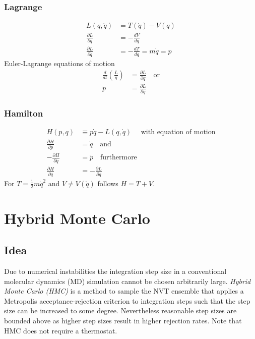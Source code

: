 \subsubsection{Lagrange}
\begin{equation}
  \begin{split}
    L(q, \dot{q}) 
    & = T(\dot{q})-V(q) \\
    \frac{\partial L}{\partial q} 
    & = -\frac{dV}{dq} \\
    \frac{\partial L}{\partial \dot{q}} 
    & = -\frac{dT}{d\dot{q}} = m\dot{q}=p
  \end{split}
\end{equation}
Euler-Lagrange equations of motion
\begin{equation}
  \begin{split}
    \frac{d}{dt}\left(\frac{L}{\dot{q}}\right) 
    & = \frac{\partial L}{\partial q} \quad \textrm{or} \\
    \dot{p} 
    & = \frac{\partial L}{\partial q} 
  \end{split}
\end{equation}
\subsubsection{Hamilton}
\begin{equation}
  \begin{split}
    H(p,q) 
    & \equiv p\dot{q}-L(q,\dot{q}) \quad \textrm{ with equation of motion} \\
    \frac{\partial H}{\partial p} 
    & = \dot{q} \quad \textrm{and} \\
    -\frac{\partial H}{\partial q}
    & = \dot{p} \quad \textrm{furthermore} \\
    \frac{\partial H}{\partial q} 
    & =  -\frac{\partial L}{\partial q} 
  \end{split}
\end{equation}
For \( T = \frac{1}{2}m\dot{q}^2\) and \( V \neq V(\dot{q}) \) follows \(H = T+V\).

\section{Hybrid Monte Carlo}
\label{hybridmontecarlo}

\subsection{Idea}

Due to numerical instabilities the integration step size in a conventional molecular dynamics (MD) simulation cannot be chosen arbitrarily large. 
\textit{Hybrid Monte Carlo (HMC)} is a method to sample the NVT ensemble that applies a Metropolis acceptance-rejection criterion to integration steps such that the step size can be increased to some degree.
Nevertheless reasonable step sizes are bounded above as higher step sizes result in higher rejection rates.
Note that HMC does not require a thermostat.

